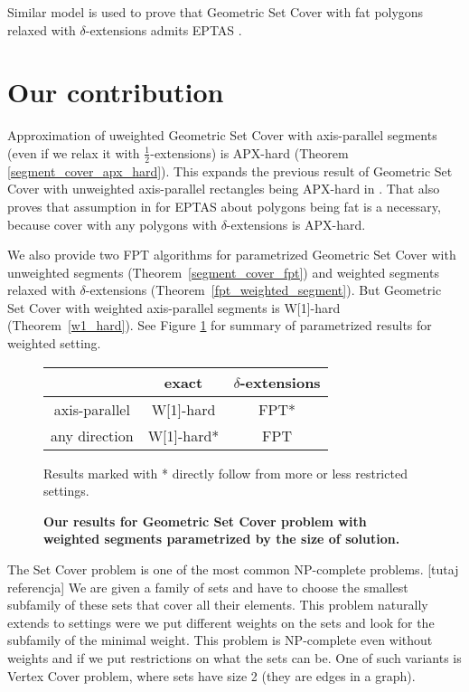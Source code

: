 Similar model is used to prove that Geometric Set Cover with fat polygons
relaxed with $\delta$-extensions admits EPTAS \cite{harpeled12}.

\section*{Our contribution}
Approximation of uweighted Geometric Set Cover with axis-parallel segments
(even if we relax it with  $\frac{1}{2}$-extensions) is APX-hard
(Theorem \ref{segment_cover_apx_hard}).
This expands the previous result of Geometric Set Cover
with unweighted axis-parallel rectangles being APX-hard in \cite{rectangles_apx_hard}.
That also proves that assumption in \cite{harpeled12}
for EPTAS about polygons being fat is a necessary, because
cover with any polygons with $\delta$-extensions is APX-hard.

We also provide two FPT algorithms for parametrized Geometric Set Cover 	
with unweighted segments (Theorem~\ref{segment_cover_fpt})
and weighted segments relaxed with $\delta$-extensions
(Theorem~\ref{fpt_weighted_segment}).
But Geometric Set Cover with weighted
axis-parallel segments is W[1]-hard (Theorem~\ref{w1_hard}).
See Figure \ref{tab:weighted_fpt} for summary of parametrized
results for weighted setting.

\begin{figure}[h]
\begin{center}
\begin{tabular}{ | c | c | c | }
\hline
                & exact     & $\delta$-extensions \\ 
\hline                
 axis-parallel   & W[1]-hard & FPT* \\  
\hline                
 any direction   & W[1]-hard* & FPT \\
\hline                
\end{tabular}
\caption{\textbf{Our results for Geometric Set Cover problem with weighted segments 
parametrized by the size of solution.}}

Results marked with * directly follow from more or less restricted settings.
\label{tab:weighted_fpt}
\end{center}
\end{figure}


\iffalse

The Set Cover problem is one of the most common NP-complete problems.
[tutaj referencja]
We are given a family of sets and have to choose the smallest
subfamily of these sets that cover all their elements.
This problem naturally extends to settings
were we put different weights on the sets
and look for the subfamily of the minimal weight.
This problem is NP-complete even 
without weights and if we put
restrictions on what the sets can be.
One of such variants is Vertex Cover problem,
where sets have size 2 (they are edges in a graph).

